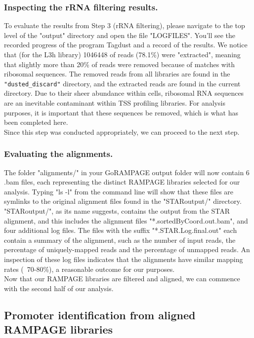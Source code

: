 \documentclass[runningheads,a4paper]{llncs}
\begin{document}
\begin{linenumbers}
\subsubsection{Inspecting the rRNA filtering results.}

To evaluate the results from Step 3 (rRNA filtering), please navigate to the top level of the "output" directory and open the file "LOGFILES".
You'll see the recorded progress of the program Tagdust and a record of the results.
We notice that (for the L3h library) 1046448 of reads (78.1\%) were "extracted", meaning that slightly more than 20\% of reads were removed because of matches with ribosomal sequences.
The removed reads from all libraries are found in the \texttt{"dusted\_discard"} directory, and the extracted reads are found in the current directory. 
Due to their sheer abundance within cells, ribosomal RNA sequences are an inevitable contaminant within TSS profiling libraries. 
For analysis purposes, it is important that these sequences be removed, which is what has been completed here.\\
Since this step was conducted appropriately, we can proceed to the next step.

\subsubsection{Evaluating the alignments.}

The folder "alignments/" in your GoRAMPAGE output folder will now contain 6 .bam files, each representing the distinct RAMPAGE libraries selected for our analysis.
Typing "ls -l" from the command line will show that these files are symlinks to the original alignment files found in the "STARoutput/" directory.
"STARoutput/", as its name suggests, contains the output from the STAR alignment, and this includes the alignment files "*.sortedByCoord.out.bam", and four additional log files.
The files with the suffix "*.STAR.Log.final.out" each contain a summary of the alignment, such as the number of input reads, the percentage of uniquely-mapped reads and the percentage of unmapped reads.
An inspection of these log files indicates that the alignments have similar mapping rates (~70-80\%), a reasonable outcome for our purposes.\\

\noindent
Now that our RAMPAGE libraries are filtered and aligned, we can commence with the second half of our analysis.

\subsection{Promoter identification from aligned RAMPAGE libraries}


\end{linenumbers}
\end{document}
